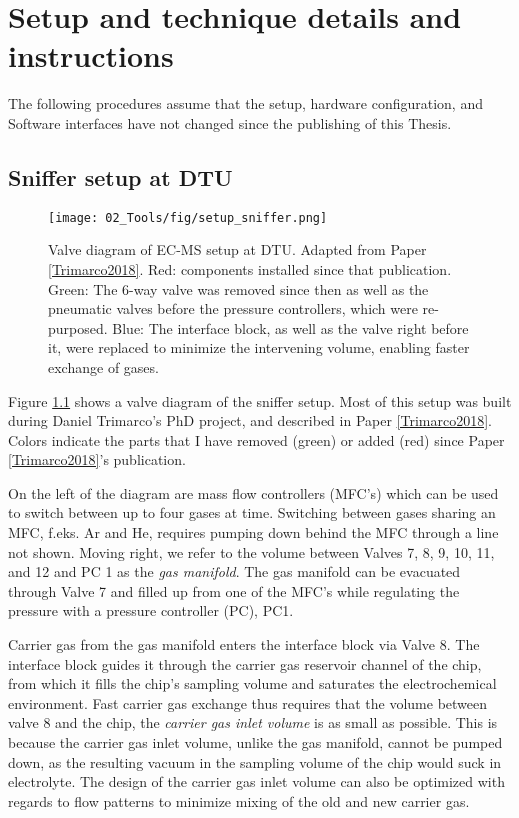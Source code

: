 
\chapter{Setup and technique details and instructions}\label{app:instructions}


The following procedures assume that the setup, hardware configuration, and Software interfaces have not changed since the publishing of this Thesis.

\section{Sniffer setup at DTU}\label{app:sniffer}


\begin{figure}[h!]
	\texttt{[image: 02\_Tools/fig/setup\_sniffer.png]}
	\caption{Valve diagram of EC-MS setup at DTU. Adapted from Paper \ref{Trimarco2018}. Red: components installed since that publication. Green: The 6-way valve was removed since then as well as the pneumatic valves before the pressure controllers, which were re-purposed. Blue: The interface block, as well as the valve right before it, were replaced to minimize the intervening volume, enabling faster exchange of gases.}
	\label{fig:sniffer}
\end{figure}
Figure \ref{fig:sniffer} shows a valve diagram of the sniffer setup. Most of this setup was built during Daniel Trimarco's PhD project\cite{Trimarco2017_PhD}, and described in Paper \ref{Trimarco2018}. Colors indicate the parts that I have removed (green) or added (red) since Paper \ref{Trimarco2018}'s publication.

On the left of the diagram are mass flow controllers (MFC's) which can be used to switch between up to four gases at time. Switching between gases sharing an MFC, f.eks. Ar and He, requires pumping down behind the MFC through a line not shown. Moving right, we refer to the volume between Valves 7, 8, 9, 10, 11, and 12 and PC 1 as the \textit{gas manifold}. The gas manifold can be evacuated through Valve 7 and filled up from one of the MFC's while regulating the pressure with a pressure controller (PC), PC1.

Carrier gas from the gas manifold enters the interface block via Valve 8. The interface block guides it through the carrier gas reservoir channel of the chip, from which it fills the chip's sampling volume and saturates the electrochemical environment. Fast carrier gas exchange thus requires that the volume between valve 8 and the chip, the \textit{carrier gas inlet volume} is as small as possible. This is because the carrier gas inlet volume, unlike the gas manifold, cannot be pumped down, as the resulting vacuum in the sampling volume of the chip would suck in electrolyte. The design of the carrier gas inlet volume can also be optimized with regards to flow patterns to minimize mixing of the old and new carrier gas. 

